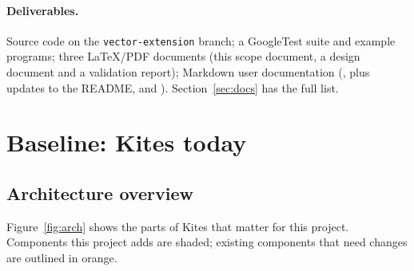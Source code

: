 \documentclass[11pt]{article}
\begin{document}
\paragraph{Deliverables.} Source code on the \texttt{vector-extension} branch; a GoogleTest suite
and example programs; three LaTeX/PDF documents (this scope document, a design document and a
validation report); Markdown user documentation (, plus updates to the README,
 and ). Section~\ref{sec:docs} has the full list.

\section{Baseline: Kites today}\label{sec:baseline}

\subsection{Architecture overview}

Figure~\ref{fig:arch} shows the parts of Kites that matter for this project. Components this
project adds are shaded; existing components that need changes are outlined in orange.
\end{document}
